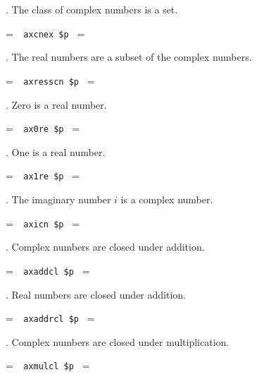 . The class of complex numbers is a set.

\setbox\startprefix=\hbox{\tt \ \ axcnex\ \$p\ }
\setbox\contprefix=\hbox{\tt \ \ \ \ \ \ \ \ \ \ \ \ }
\startm
\m{\vdash}\m{\in}
\endm

. The real numbers are a subset of the complex numbers.

\setbox\startprefix=\hbox{\tt \ \ axresscn\ \$p\ }
\setbox\contprefix=\hbox{\tt \ \ \ \ \ \ \ \ \ \ \ \ \ \ }
\startm
\m{\vdash}\m{\subseteq}
\endm

. Zero is a real number.

\setbox\startprefix=\hbox{\tt \ \ ax0re\ \$p\ }
\setbox\contprefix=\hbox{\tt \ \ \ \ \ \ \ \ \ \ \ }
\startm
\m{\vdash}\m{\in}
\endm

. One is a real number.

\setbox\startprefix=\hbox{\tt \ \ ax1re\ \$p\ }
\setbox\contprefix=\hbox{\tt \ \ \ \ \ \ \ \ \ \ \ }
\startm
\m{\vdash}\m{\in}
\endm

. The imaginary number $i$ is a complex number.

\setbox\startprefix=\hbox{\tt \ \ axicn\ \$p\ }
\setbox\contprefix=\hbox{\tt \ \ \ \ \ \ \ \ \ \ \ }
\startm
\m{\vdash}\m{\in}
\endm

. Complex numbers are closed under addition.

\setbox\startprefix=\hbox{\tt \ \ axaddcl\ \$p\ }
\setbox\contprefix=\hbox{\tt \ \ \ \ \ \ \ \ \ \ \ \ \ }
\startm
\m{\vdash}\m{(}\m{(}\m{\in}\m{\wedge}\m{\in}%
\m{)}\m{\rightarrow}\m{(}\m{+}\m{)}\m{\in}\m{)}
\endm

. Real numbers are closed under addition.

\setbox\startprefix=\hbox{\tt \ \ axaddrcl\ \$p\ }
\setbox\contprefix=\hbox{\tt \ \ \ \ \ \ \ \ \ \ \ \ \ \ }
\startm
\m{\vdash}\m{(}\m{(}\m{\in}\m{\wedge}\m{\in}%
\m{)}\m{\rightarrow}\m{(}\m{+}\m{)}\m{\in}\m{)}
\endm

. Complex numbers are closed under multiplication.

\setbox\startprefix=\hbox{\tt \ \ axmulcl\ \$p\ }
\setbox\contprefix=\hbox{\tt \ \ \ \ \ \ \ \ \ \ \ \ \ }
\startm
\m{\vdash}\m{(}\m{(}\m{\in}\m{\wedge}\m{\in}%
\m{)}\m{\rightarrow}\m{(}\m{\cdot}\m{)}\m{\in}\m{)}
\endm

